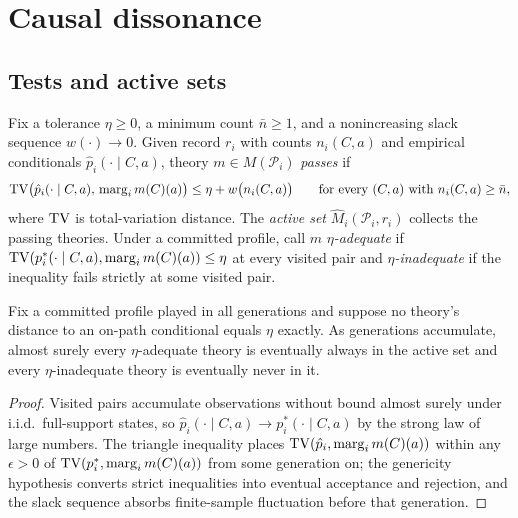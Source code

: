 \section{Causal dissonance}
\label{sec:dissonance}

\subsection{Tests and active sets}

\begin{definition}
\label{def:test}
Fix a tolerance $\eta\geq0$, a minimum count $\bar n\geq1$, and a
nonincreasing slack sequence $w(\cdot)\to0$.  Given record $r_i$ with counts
$n_i(C,a)$ and empirical conditionals $\hat p_i(\cdot\mid C,a)$, theory
$m\in M(\mathcal P_i)$ \emph{passes} if
\begin{equation}
\operatorname{TV}\bigl(\hat p_i(\cdot\mid C,a),\,\operatorname{marg}_{i}m(C)(a)\bigr)
\leq
\eta+w\bigl(n_i(C,a)\bigr)
\qquad
\text{for every }(C,a)\text{ with }n_i(C,a)\geq\bar n,
\label{eq:test}
\end{equation}
where $\operatorname{TV}$ is total-variation distance.  The \emph{active set}
$\widehat M_i(\mathcal P_i,r_i)$ collects the passing theories.  Under a
committed profile, call $m$ \emph{$\eta$-adequate} if
$\operatorname{TV}(p_i^{*}(\cdot\mid C,a),\operatorname{marg}_{i}m(C)(a))\leq\eta$ at every visited pair
and \emph{$\eta$-inadequate} if the inequality fails strictly at some visited
pair.
\end{definition}

\begin{lemma}
\label{lem:test-consistency}
Fix a committed profile played in all generations and suppose no theory's
distance to an on-path conditional equals $\eta$ exactly.  As generations
accumulate, almost surely every $\eta$-adequate theory is eventually always
in the active set and every $\eta$-inadequate theory is eventually never in
it.
\end{lemma}

\begin{proof}
Visited pairs accumulate observations without bound almost surely under
i.i.d.\ full-support states, so
$\hat p_i(\cdot\mid C,a)\to p_i^{*}(\cdot\mid C,a)$ by the strong law of
large numbers.  The triangle inequality places
$\operatorname{TV}(\hat p_i,\operatorname{marg}_{i}m(C)(a))$ within any $\epsilon>0$ of
$\operatorname{TV}(p_i^{*},\operatorname{marg}_{i}m(C)(a))$ from some generation on; the genericity
hypothesis converts strict inequalities into eventual acceptance and
rejection, and the slack sequence absorbs finite-sample fluctuation before
that generation.
\end{proof}

